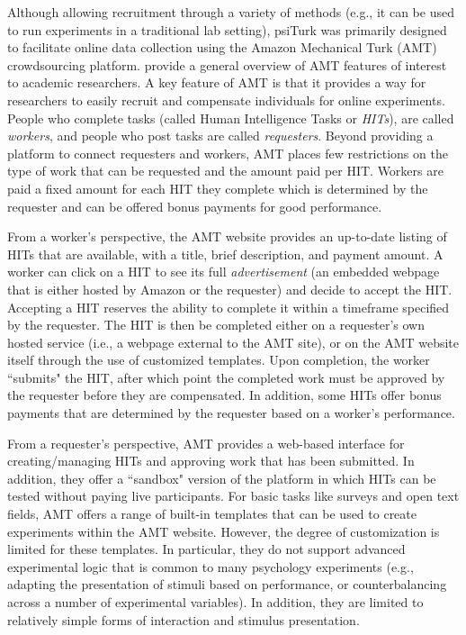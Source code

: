 \documentclass[twocolumn]{svjour3}          %
\begin{document}
Although allowing recruitment through a variety of methods (e.g., it can be
used to run experiments in a traditional lab setting),
\textsf{psiTurk} was primarily designed to facilitate online data collection using
the Amazon Mechanical Turk (AMT) crowdsourcing platform.
\cite{Mason:2012xy} provide a general overview of AMT features of
interest to academic researchers.  A key feature of AMT is that it provides a way for researchers
to easily recruit and compensate individuals for online experiments.  
People who complete tasks (called Human Intelligence Tasks or \emph{HITs}), are 
called \emph{workers}, and people who post tasks are called \emph{requesters}.
Beyond providing a platform to connect requesters and workers, AMT places few restrictions 
on the type of work that can be requested and the amount paid per HIT.  Workers are 
paid a fixed amount for each HIT they complete which is determined by the requester and
can be offered bonus payments for good performance.

From a worker's perspective, the AMT website provides an up-to-date listing of HITs that 
are available, with a title, brief description, and payment amount.  A worker can click on a HIT to 
see its full \emph{advertisement} (an embedded webpage that is either hosted by
Amazon or the requester) and decide to accept the HIT. 
Accepting a HIT reserves the ability to complete it within a timeframe specified by the requester.
The HIT is then be completed either on a requester's own hosted service (i.e., a webpage 
external to the AMT site), or on the AMT website itself through the use of customized templates.
Upon completion, the worker ``submits" the HIT, after which point the completed work must 
be approved by the requester before they are compensated.
In addition, some HITs offer bonus payments that are determined by the requester based 
on a worker's performance.

From a requester's perspective, AMT provides a web-based interface for creating/managing 
HITs and approving work that has been submitted.  In addition, they offer a ``sandbox" version 
of the platform in which HITs can be tested without paying live participants.
For basic tasks like surveys and open text fields, AMT offers a range of built-in templates that 
can be used to create experiments within the AMT website.  However, the degree of customization 
is limited for these templates. In particular, they do not support advanced experimental logic that is 
common to many psychology experiments (e.g., adapting the presentation of stimuli based on 
performance, or counterbalancing across a number of experimental variables).
In addition, they are limited to relatively simple forms of interaction and stimulus presentation.
\end{document}
